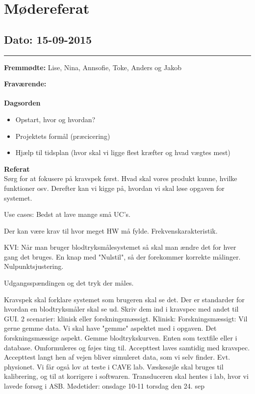 \chapter{Mødereferat}

\section{Dato: 15-09-2015}
\hrule

\textbf{Fremmødte:} Lise, Nina, Annsofie, Toke, Anders og Jakob

\textbf{Fraværende:} 
\\
\\
\textbf{Dagsorden}
\begin{itemize}
	\item Opstart, hvor og hvordan?
	\item Projektets formål (præcicering)
	\item Hjælp til tidsplan (hvor skal vi ligge flest kræfter og hvad vægtes mest)
\end{itemize}

\textbf{Referat} 
\\
Sørg for at fokusere på kravspek først. Hvad skal vores produkt kunne, hvilke funktioner osv.
Derefter kan vi kigge på, hvordan vi skal løse opgaven for systemet.

Use cases: Bedst at lave mange små UC's. 

Der kan være krav til hvor meget HW må fylde.
Frekvenskarakteristik.

KVI: Når man bruger blodtryksmålesystemet så skal man ændre det for hver gang det bruges. En knap med "Nulstil", så der forekommer korrekte målinger. Nulpunktsjustering.

Udgangsspændingen og det tryk der måles.

Kravspek skal forklare systemet som brugeren skal se det.
Der er standarder for hvordan en blodtryksmåler skal se ud. 
Skriv dem ind i kravspec med andet til GUI.
2 scenarier: klinisk eller forskningsmæssigt. 
Klinisk:
Forskningsmæssigt: Vil gerne gemme data. Vi skal have "gemme" aspektet med i opgaven. Det forskningsmæssige aspekt. Gemme blodtrykskurven. Enten som textfile eller i database.
Omformuleres og føjes ting til.
Accepttest laves samtidig med kravspec. 
Accepttest langt hen af vejen bliver simuleret data, som vi selv finder. Evt. physionet.
Vi får også lov at teste i CAVE lab.
Væskesøjle skal bruges til kalibrering, og til at korrigere i softwaren. 
Transduceren skal hentes i lab, hvor vi lavede forsøg i ASB.
Mødetider: onsdage 10-11
torsdag den 24. sep 

